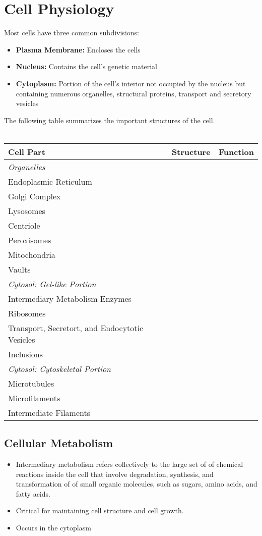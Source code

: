 \documentclass[11pt]{article}
\begin{document}
\pagebreak

\section{Cell Physiology}
Most cells have three common subdivisions:
\begin{itemize}
\item \textbf{Plasma Membrane:}  Encloses the cells
\item \textbf{Nucleus:} Contains the cell's genetic material
\item \textbf{Cytoplasm:} Portion of the cell's interior not occupied by the nucleus but containing numerous organelles, structural proteins, transport and secretory vesicles
\end{itemize}
The following table summarizes the important structures of the cell.
\\ \\
\begin{tabularx}{\textwidth}{X|X|X}
\textbf{Cell Part} & \textbf{Structure} & \textbf{Function} \\
\hline
\textit{Organelles} \\
\hline
Endoplasmic Reticulum \\
Golgi Complex \\
Lysosomes \\
Centriole \\
Peroxisomes \\
Mitochondria \\
Vaults \\
\hline
\textit{Cytosol: Gel-like Portion} \\
\hline
Intermediary Metabolism Enzymes \\
Ribosomes \\
Transport, Secretort, and Endocytotic Vesicles \\
Inclusions \\
\hline
\textit{Cytosol: Cytoskeletal Portion} \\
\hline
Microtubules \\
Microfilaments \\
Intermediate Filaments \\
\end{tabularx}

\subsection{Cellular Metabolism}
\begin{itemize}
\item Intermediary metabolism refers collectively to the large set of of chemical reactions inside the cell that involve degradation, synthesis, and transformation of of small organic molecules, such as sugars, amino acids, and fatty acids. 
\item Critical for maintaining cell structure and cell growth. \item Occurs in the cytoplasm 
\end{itemize}
\end{document}
